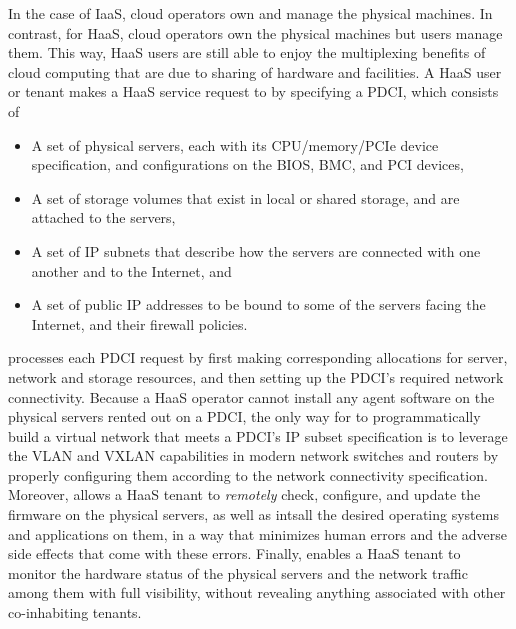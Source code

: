 In the case of IaaS, cloud operators own and manage the physical machines.
In contrast, for HaaS, cloud operators own the physical machines but users manage them. 
This way, HaaS users are still able to enjoy the multiplexing benefits of cloud computing that are due to sharing of hardware and facilities.
A HaaS user or tenant makes a HaaS service request to \na by specifying a PDCI, which consists of 
\begin{itemize} 
\setlength\itemsep{-0.04in}
\item A set of physical servers, each with its CPU/memory/PCIe device specification, and configurations on the BIOS, BMC, and PCI devices,

\item A set of storage volumes that exist in local or shared storage, and are attached to the servers,

\item A set of IP subnets that describe how the servers are connected with one another and to the Internet, and  

\item A set of public IP addresses to be bound to some of the servers facing the Internet, and their firewall policies. 

\end{itemize}
\na processes each PDCI request by first making corresponding allocations for server, network and storage resources, and 
then setting up the PDCI's required network connectivity.  Because a HaaS operator cannot install any agent software on the physical servers rented out on a PDCI, the only way for \na to programmatically build a virtual network that meets a PDCI's IP subset specification is to leverage the VLAN and VXLAN capabilities in modern network switches and routers by properly configuring them according to the network connectivity specification.  
Moreover, \na allows a HaaS tenant to {\em remotely} check, configure, and update the firmware on the physical servers, as well as intsall the desired operating systems and applications 
on them, in a way that minimizes human errors and the adverse side effects that come with these errors. 
Finally, \na enables a HaaS tenant to monitor the hardware status of the physical servers and the network traffic among them with full visibility, without revealing anything associated with other co-inhabiting tenants. 

